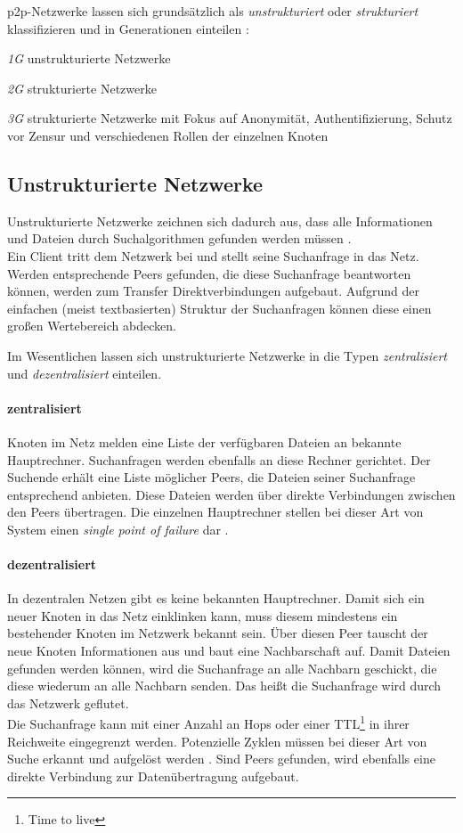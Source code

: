 p2p-Netzwerke lassen sich grundsätzlich als \emph{unstrukturiert} oder \emph{strukturiert} klassifizieren \cite{Steinmetz2005, Lua2005Survey} und in Generationen einteilen \cite{Bo2003PeertoPeer}:
\begin{itemize*}
	\item \emph{1G} unstrukturierte Netzwerke
	\item \emph{2G} strukturierte Netzwerke
	\item \emph{3G} strukturierte Netzwerke mit Fokus auf Anonymität, Authentifizierung, Schutz vor Zensur und verschiedenen Rollen der einzelnen Knoten
\end{itemize*}

\subsection{Unstrukturierte Netzwerke}
Unstrukturierte Netzwerke zeichnen sich dadurch aus, dass alle Informationen und Dateien durch Suchalgorithmen gefunden werden müssen \cite{Lv2002}. \\
Ein Client tritt dem Netzwerk bei und stellt seine Suchanfrage in das Netz. Werden entsprechende Peers gefunden, die diese Suchanfrage beantworten können, werden zum Transfer Direktverbindungen aufgebaut. Aufgrund der einfachen (meist textbasierten) Struktur der Suchanfragen können diese einen großen Wertebereich abdecken.

Im Wesentlichen lassen sich unstrukturierte Netzwerke in die Typen \emph{zentralisiert} und \emph{dezentralisiert} einteilen.

\paragraph{zentralisiert} Knoten im Netz melden eine Liste der verfügbaren Dateien an bekannte Hauptrechner. Suchanfragen werden ebenfalls an diese Rechner gerichtet. Der Suchende erhält eine Liste möglicher Peers, die Dateien seiner Suchanfrage entsprechend anbieten. Diese Dateien werden über direkte Verbindungen zwischen den Peers übertragen. Die einzelnen Hauptrechner stellen bei dieser Art von System einen \emph{single point of failure} dar \cite{Eberspaecher2005}.

\paragraph{dezentralisiert} In dezentralen Netzen gibt es keine bekannten Hauptrechner. Damit sich ein neuer Knoten in das Netz einklinken kann, muss diesem mindestens ein bestehender Knoten im Netzwerk bekannt sein. Über diesen Peer tauscht der neue Knoten Informationen aus und baut eine Nachbarschaft auf. Damit Dateien gefunden werden können, wird die Suchanfrage an alle Nachbarn geschickt, die diese wiederum an alle Nachbarn senden. Das heißt die Suchanfrage wird durch das Netzwerk geflutet.\\
Die Suchanfrage kann mit einer Anzahl an Hops oder einer TTL\footnote{Time to live} in ihrer Reichweite eingegrenzt werden. Potenzielle Zyklen müssen bei dieser Art von Suche erkannt und aufgelöst werden \cite{Lv2002}. Sind Peers gefunden, wird ebenfalls eine direkte Verbindung zur Datenübertragung aufgebaut. 

